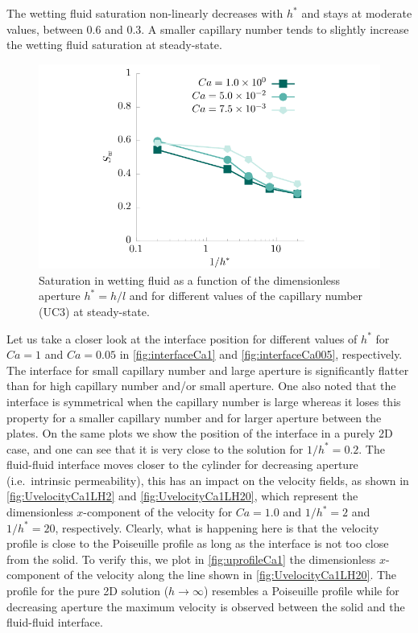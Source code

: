 \documentclass[]{article}
\begin{document}
The wetting fluid saturation non-linearly decreases with \(h^*\) and
stays at moderate values, between 0.6 and 0.3. A smaller capillary
number tends to slightly increase the wetting fluid saturation at
steady-state.

\begin{figure}
\hypertarget{fig:saturation}{%
\centering
\includegraphics{figures/pdf/saturation.pdf}
\caption{Saturation in wetting fluid as a function of the dimensionless
aperture \(h^{*}=h/l\) and for different values of the capillary number
(UC3) at steady-state.}\label{fig:saturation}
}
\end{figure}

Let us take a closer look at the interface position for different values
of \(h^*\) for \(Ca=1\) and \(Ca=0.05\) in \cref{fig:interfaceCa1} and
\cref{fig:interfaceCa005}, respectively. The interface for small
capillary number and large aperture is significantly flatter than for
high capillary number and/or small aperture. One also noted that the
interface is symmetrical when the capillary number is large whereas it
loses this property for a smaller capillary number and for larger
aperture between the plates. On the same plots we show the position of
the interface in a purely 2D case, and one can see that it is very close
to the solution for \(1/h^*=0.2\). The fluid-fluid interface moves
closer to the cylinder for decreasing aperture (i.e.~intrinsic
permeability), this has an impact on the velocity fields, as shown in
\cref{fig:UvelocityCa1LH2} and \cref{fig:UvelocityCa1LH20}, which
represent the dimensionless \(x\)-component of the velocity for
\(Ca=1.0\) and \(1/h^*=2\) and \(1/h^*=20\), respectively. Clearly, what
is happening here is that the velocity profile is close to the
Poiseuille profile as long as the interface is not too close from the
solid. To verify this, we plot in \cref{fig:uprofileCa1} the
dimensionless \(x\)-component of the velocity along the line shown in
\cref{fig:UvelocityCa1LH20}. The profile for the pure 2D solution
(\(h\rightarrow\infty\)) resembles a Poiseuille profile while for
decreasing aperture the maximum velocity is observed between the solid
and the fluid-fluid interface.
\end{document}
